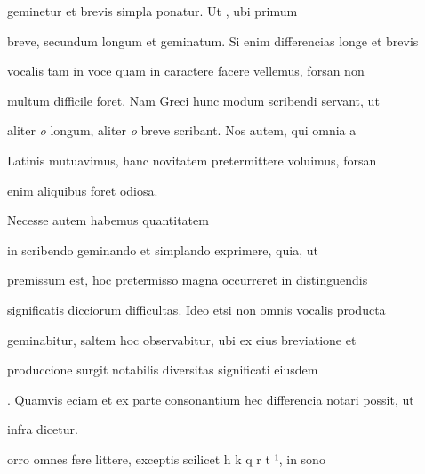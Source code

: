 geminetur et brevis simpla ponatur. Ut , ubi primum 

breve, secundum longum et geminatum. Si enim differencias longe et brevis

vocalis tam in voce quam in caractere facere vellemus, forsan non

multum difficile foret. Nam Greci hunc modum scribendi servant, ut

aliter \textit{o} longum, aliter \textit{o} breve scribant. Nos autem, qui omnia a

Latinis mutuavimus, hanc novitatem pretermittere voluimus, forsan

\splitlines{}

enim aliquibus foret odiosa.

\indentK Necesse autem habemus quantitatem 

\fulllines{}

 in scribendo geminando et simplando exprimere, quia, ut

premissum est, hoc pretermisso magna occurreret in distinguendis

significatis dicciorum difficultas. Ideo etsi non omnis vocalis producta

geminabitur, saltem hoc observabitur, ubi ex eius breviatione et

produccione surgit notabilis diversitas significati eiusdem 

. Quamvis eciam et ex parte consonantium hec differencia notari possit, ut




infra dicetur.

\indentK {}orro omnes fere littere, exceptis scilicet  h  k q r t ¹, in sono 

